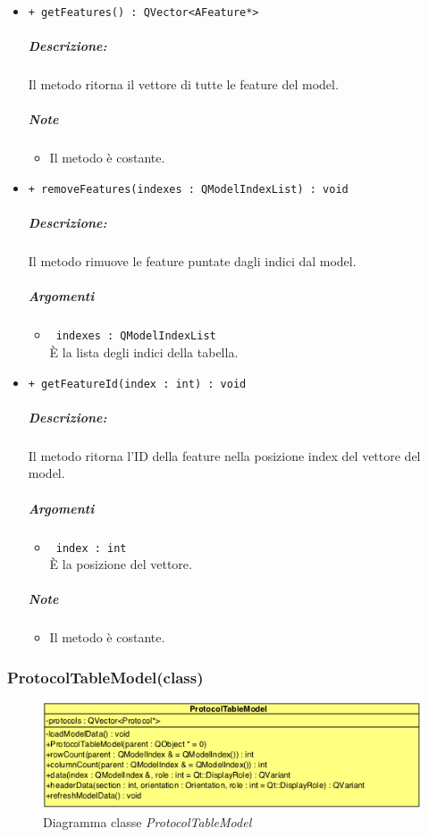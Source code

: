 {\begin{itemize}
	\item \color{blue}\verb!+ getFeatures() : QVector<AFeature*>!\\
		\color{black}
		\subparagraph{Descrizione:} Il metodo ritorna il vettore di tutte le feature\g{} del model.\\
		\subparagraph{Note}
				\begin{itemize}
					\item Il metodo è costante.
				\end{itemize}
		
	\item \color{blue}\verb!+ removeFeatures(indexes : QModelIndexList) : void!\\
		\color{black}
		\subparagraph{Descrizione:} Il metodo rimuove le feature\g{} puntate dagli indici dal model.\\
		\subparagraph{Argomenti}
			\begin{itemize}				
				\item \color{RoyalPurple}\verb! indexes : QModelIndexList!\\
				\color{black} È la lista degli indici della tabella.
			\end{itemize}
			
	\item \color{blue}\verb!+ getFeatureId(index : int) : void!\\
		\color{black}
		\subparagraph{Descrizione:} Il metodo ritorna l'ID della feature\g{} nella posizione index del vettore del model.\\
		\subparagraph{Argomenti}
			\begin{itemize}				
				\item \color{RoyalPurple}\verb! index : int!\\
				\color{black} È la posizione del vettore.
			\end{itemize}
		\subparagraph{Note}
				\begin{itemize}
					\item Il metodo è costante.
				\end{itemize}
\end{itemize}
\pagebreak


\subsubsection{ProtocolTableModel(class)}
\label{ProtocolTableModel}
\begin{figure}[!h]
	\centering
	\includegraphics[width=0.6\linewidth]{./Content/Immagini/QtModel/ProtocolTableModel.png}
	\caption{Diagramma classe \textsl{ProtocolTableModel}}
	\label{comp_ProtocolTableModel}
\end{figure}

}
